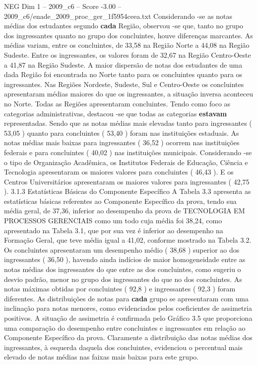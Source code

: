 \begin{textsample}{NEG Dim 1 – 2009\_c6 – Score -3.00 – 2009\_c6/enade\_2009\_proc\_ger\_1f5954ceea.txt}
Considerando -se as notas médias dos estudantes segundo \textbf{cada} Região, observou -se que, tanto no grupo dos ingressantes quanto no grupo dos concluintes, houve diferenças marcantes.
As médias variam, entre os concluintes, de 33,58 na Região Norte a 44,08 na Região Sudeste.
Entre os ingressantes, os valores foram de 32,67 na Região Centro-Oeste a 41,87 na Região Sudeste.
A maior dispersão de notas dos estudantes de uma dada Região foi encontrada no Norte tanto para os concluintes quanto para os ingressantes.
Nas Regiões Nordeste, Sudeste, Sul e Centro-Oeste os concluintes apresentaram médias maiores do que os ingressantes, a situação inversa aconteceu no Norte.
Todas as Regiões apresentaram concluintes.
Tendo como foco as categorias administrativas, destacou -se que todas as categorias \textbf{estavam} representadas.
Sendo que as notas médias mais elevadas tanto para ingressantes ( 53,05 ) quanto para concluintes ( 53,40 ) foram nas instituições estaduais.
As notas médias mais baixas para ingressantes ( 36,52 ) ocorrem nas instituições federais e para concluintes ( 40,02 ) nas instituições municipais.
Considerando -se o tipo de Organização Acadêmica, os Institutos Federais de Educação, Ciência e Tecnologia apresentaram os maiores valores para concluintes ( 46,43 ).
E os Centros Universitários apresentaram os maiores valores para ingressantes ( 42,75 ). 3.1.3 Estatísticas Básicas do Componente Específico A Tabela 3.3 apresenta as estatísticas básicas referentes ao Componente Específico da prova, tendo sua média geral, de 37,36, inferior ao desempenho da prova de TECNOLOGIA EM PROCESSOS GERENCIAIS como um todo cuja média foi 38,24, como apresentado na Tabela 3.1, que por sua vez é inferior ao desempenho na Formação Geral, que teve média igual a 41,02, conforme mostrado na Tabela 3.2.
Os concluintes apresentaram um desempenho médio ( 38,68 ) superior ao dos ingressantes ( 36,50 ), havendo ainda indícios de maior homogeneidade entre as notas médias dos ingressantes do que entre as dos concluintes, como sugeriu o desvio padrão, menor no grupo dos ingressantes do que no dos concluintes.
As notas máximas obtidas por concluintes ( 92,8 ) e ingressantes ( 92,3 ) foram diferentes.
As distribuições de notas para \textbf{cada} grupo se apresentaram com uma inclinação para notas menores, como evidenciados pelos coeficientes de assimetria positivos.
A situação de assimetria é confirmada pelo Gráfico 3.5 que proporciona uma comparação do desempenho entre concluintes e ingressantes em relação ao Componente Específico da prova.
Claramente a distribuição das notas médias dos ingressantes, à esquerda daquela dos concluintes, evidenciou o percentual mais elevado de notas médias nas faixas mais baixas para este grupo.

\end{textsample}
